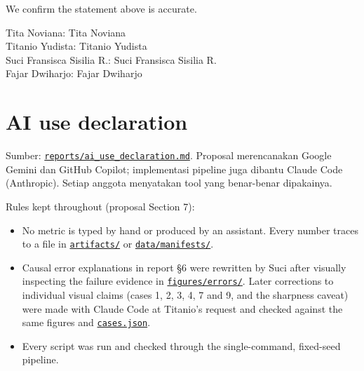 \documentclass[10pt,a4paper]{article}
\providecommand{\tightlist}{\setlength{\itemsep}{2pt}\setlength{\parskip}{0pt}}
\begin{document}
We confirm the statement above is accurate.

Tita Noviana: Tita Noviana\\
Titanio Yudista: Titanio Yudista\\
Suci Fransisca Sisilia R.: Suci Fransisca Sisilia R.\\
Fajar Dwiharjo: Fajar Dwiharjo

\section{AI use declaration}\label{ai-use-declaration}

Sumber: \href{https://github.com/Universitas-Cakrawala/semarang-batik-fine-grained-transfer-learning/blob/main/reports/ai_use_declaration.md}{\texttt{reports/\allowbreak{}ai\_\allowbreak{}use\_\allowbreak{}declaration.md}}. Proposal merencanakan Google Gemini dan GitHub Copilot;
implementasi pipeline juga dibantu Claude Code (Anthropic). Setiap anggota menyatakan tool yang
benar-benar dipakainya.

Rules kept throughout (proposal Section 7):

\begin{itemize}
\tightlist
\item
  No metric is typed by hand or produced by an assistant. Every number traces to a
  file in \href{https://github.com/Universitas-Cakrawala/semarang-batik-fine-grained-transfer-learning/tree/main/artifacts}{\texttt{artifacts/\allowbreak{}}} or \href{https://github.com/Universitas-Cakrawala/semarang-batik-fine-grained-transfer-learning/tree/main/data/manifests}{\texttt{data/\allowbreak{}manifests/\allowbreak{}}}.
\item
  Causal error explanations in report §6 were rewritten by Suci after visually inspecting the
  failure evidence in \href{https://github.com/Universitas-Cakrawala/semarang-batik-fine-grained-transfer-learning/tree/main/figures/errors}{\texttt{figures/\allowbreak{}errors/\allowbreak{}}}. Later corrections to individual visual claims (cases 1, 2,
  3, 4, 7 and 9, and the sharpness caveat) were made with Claude Code at Titanio's request and
  checked against the same figures and \href{https://github.com/Universitas-Cakrawala/semarang-batik-fine-grained-transfer-learning/blob/main/artifacts/error_analysis/G1g_customcnn-scratch_augon_s42/cases.json}{\texttt{cases.json}}.
\item
  Every script was run and checked through the single-command, fixed-seed pipeline.
\end{itemize}
\end{document}
